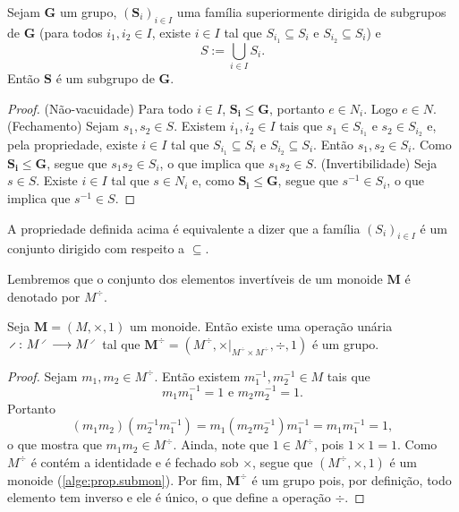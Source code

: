 \begin{proposition}
\label{alge:prop.subgru.uni}
Sejam $\bm G$ um grupo, $(\bm S_i)_{i \in I}$ uma família superiormente dirigida de subgrupos de $\bm G$ (para todos $i_1,i_2 \in I$, existe $i \in I$ tal que $S_{i_1} \subseteq S_i$ e $S_{i_2} \subseteq S_i$) e
	\begin{equation*}
	S := \bigcup_{i \in I} S_i.
	\end{equation*}
Então $\bm S$ é um subgrupo de $\bm G$.
\end{proposition}
\begin{proof}
(Não-vacuidade) Para todo $i \in I$, $\bm{S_i}\leq \bm G$, portanto $e \in N_i$. Logo $e \in N$. (Fechamento) Sejam $s_1,s_2 \in S$. Existem $i_1,i_2 \in I$ tais que $s_1 \in S_{i_1}$ e $s_2 \in S_{i_2}$ e, pela propriedade, existe $i \in I$ tal que $S_{i_1} \subseteq S_{i} \text{\ \ e\ \ } S_{i_2} \subseteq S_{i}$. Então $s_1,s_2 \in S_i$. Como $\bm{S_i} \leq \bm G$, segue que $s_1s_2 \in S_i$, o que implica que $s_1s_2 \in S$. (Invertibilidade) Seja $s \in S$. Existe $i \in I$ tal que $s \in N_i$ e, como $\bm{S_i} \leq \bm G$, segue que $s^{-1} \in S_i$, o que implica que $s^{-1} \in S$.
\end{proof}

A propriedade definida acima é equivalente a dizer que a família $(S_i)_{i \in I}$ é um conjunto dirigido com respeito a $\subseteq$.

Lembremos que o conjunto dos elementos invertíveis de um monoide $\bm M$ é denotado por $M^{\div}$.


\begin{proposition}
Seja $\bm M = (M,\times,1)$ um monoide. Então existe uma operação unária $\fun{\div}{M^{\div}}{M^{\div}}$ tal que $\bm{M^{\div}}=(M^{\div},\times|_{M^{\div} \times M^{\div}},\div,1)$ é um grupo.
\end{proposition}
\begin{proof}
	Sejam $m_1,m_2 \in M^{\div}$. Então existem $m_1^{-1},m_2^{-1} \in M$ tais que
	\begin{equation*}
	m_1m_1^{-1}=1 \text{\ \ e\ \ } m_2m_2^{-1}=1.
	\end{equation*}
Portanto
	\begin{equation*}
	(m_1m_2)(m_2^{-1}m_1^{-1}) = m_1(m_2m_2^{-1})m_1^{-1} = m_1m_1^{-1} = 1,
	\end{equation*}
o que mostra que $m_1m_2 \in M^{\div}$. Ainda, note que $1 \in M^{\div}$, pois $1 \times 1 = 1$. Como $M^{\div}$ é contém a identidade e é fechado sob $\times$, segue que $(M^{\div},\times,1)$ é um monoide (\ref{alge:prop.submon}). Por fim, $\bm{M^{\div}}$ é um grupo pois, por definição, todo elemento tem inverso e ele é único, o que define a operação $\div$.
\end{proof}

